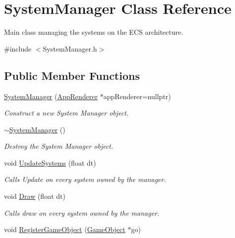 \hypertarget{classSystemManager}{}\section{System\+Manager Class Reference}
\label{classSystemManager}


Main class managing the systems on the E\+CS architecture.  




{\ttfamily \#include $<$System\+Manager.\+h$>$}

\subsection*{Public Member Functions}
\begin{DoxyCompactItemize}
\item 
\hyperlink{classSystemManager_ae62443992cf22979a4a70ceb8c140951}{System\+Manager} (\hyperlink{classAppRenderer}{App\+Renderer} $\ast$app\+Renderer=nullptr)
\begin{DoxyCompactList}\small\item\em Construct a new System Manager object. \end{DoxyCompactList}\item 
\mbox{\label{classSystemManager_a0fa2e3c0906401494f6bf4e482aecc0d}} 
\hyperlink{classSystemManager_a0fa2e3c0906401494f6bf4e482aecc0d}{$\sim$\+System\+Manager} ()
\begin{DoxyCompactList}\small\item\em Destroy the System Manager object. \end{DoxyCompactList}\item 
void \hyperlink{classSystemManager_a077c85af7097d1420167ab3f10984a1c}{Update\+Systems} (float dt)
\begin{DoxyCompactList}\small\item\em Calls Update on every system owned by the manager. \end{DoxyCompactList}\item 
void \hyperlink{classSystemManager_a1bab92d089c6c9546776fabf6e1e3098}{Draw} (float dt)
\begin{DoxyCompactList}\small\item\em Calls draw on every system owned by the manager. \end{DoxyCompactList}\item 
void \hyperlink{classSystemManager_aaa98d81346a3d7ef4a8d8fb109525e4c}{Register\+Game\+Object} (\hyperlink{classGameObject}{Game\+Object} $\ast$go)

\end{DoxyCompactItemize}

